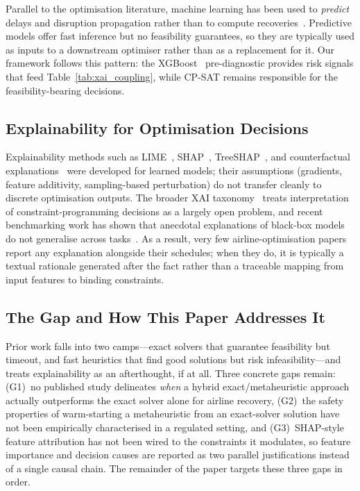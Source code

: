 \documentclass[12pt,number]{elsarticle}
\begin{document}
Parallel to the optimisation literature, machine learning has been used to \emph{predict} delays and disruption propagation rather than to compute recoveries~\cite{ahmadbeygi2008,gui2020,jacquillat2015}. Predictive models offer fast inference but no feasibility guarantees, so they are typically used as inputs to a downstream optimiser rather than as a replacement for it. Our framework follows this pattern: the XGBoost~\cite{chen2016} pre-diagnostic provides risk signals that feed Table~\ref{tab:xai_coupling}, while CP-SAT remains responsible for the feasibility-bearing decisions.

\subsection{Explainability for Optimisation Decisions}

Explainability methods such as LIME~\cite{ribeiro2016}, SHAP~\cite{lundberg2017}, TreeSHAP~\cite{lundberg2020}, and counterfactual explanations~\cite{wachter2018} were developed for learned models; their assumptions (gradients, feature additivity, sampling-based perturbation) do not transfer cleanly to discrete optimisation outputs. The broader XAI taxonomy~\cite{arrieta2020} treats interpretation of constraint-programming decisions as a largely open problem, and recent benchmarking work has shown that anecdotal explanations of black-box models do not generalise across tasks~\cite{nauta2023}. As a result, very few airline-optimisation papers report any explanation alongside their schedules; when they do, it is typically a textual rationale generated after the fact rather than a traceable mapping from input features to binding constraints.

\subsection{The Gap and How This Paper Addresses It}

Prior work falls into two camps---exact solvers that guarantee feasibility but timeout, and fast heuristics that find good solutions but risk infeasibility---and treats explainability as an afterthought, if at all. Three concrete gaps remain: (G1)~no published study delineates \emph{when} a hybrid exact/metaheuristic approach actually outperforms the exact solver alone for airline recovery, (G2)~the safety properties of warm-starting a metaheuristic from an exact-solver solution have not been empirically characterised in a regulated setting, and (G3)~SHAP-style feature attribution has not been wired to the constraints it modulates, so feature importance and decision causes are reported as two parallel justifications instead of a single causal chain. The remainder of the paper targets these three gaps in order.
\end{document}
